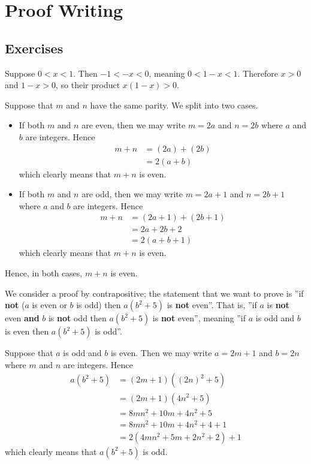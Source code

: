 \section{Proof Writing}
\subsection*{Exercises}
\begin{questions}
    \item Suppose $0 < x < 1$. Then $-1 < -x < 0$, meaning $0 < 1 - x < 1$. Therefore $x > 0$ and $1-x > 0$, so their product $x(1-x) > 0$.

    \item Suppose that $m$ and $n$ have the same parity. We split into two cases.
        \begin{itemize}
            \item If both $m$ and $n$ are even, then we may write $m = 2a$ and $n = 2b$ where $a$ and $b$ are integers. Hence
            \begin{align*}
                m + n &= (2a) + (2b) \\
                &= 2(a+b)
            \end{align*}
            which clearly means that $m + n$ is even.
            \item If both $m$ and $n$ are odd, then we may write $m = 2a + 1$ and $n = 2b + 1$ where $a$ and $b$ are integers. Hence
            \begin{align*}
                m + n &= (2a + 1) + (2b + 1)\\
                &= 2a + 2b + 2\\
                &= 2(a + b + 1)
            \end{align*}
            which clearly means that $m+n$ is even.
        \end{itemize}
    Hence, in both cases, $m + n$ is even.

    \item We consider a proof by contrapositive; the statement that we want to prove is ''if \textbf{not} ($a$ is even or $b$ is odd) then $a(b^2+5)$ is \textbf{not} even''. That is, ''if $a$ is \textbf{not} even \textbf{and} $b$ is \textbf{not} odd then $a(b^2+5)$ is \textbf{not} even'', meaning ''if $a$ is odd and $b$ is even then $a(b^2+5)$ is odd''.

    Suppose that $a$ is odd and $b$ is even. Then we may write $a = 2m + 1$ and $b = 2n$ where $m$ and $n$ are integers. Hence
    \begin{align*}
        a(b^2+5) &= (2m+1)\left((2n)^2 + 5\right)\\
        &= (2m+1)(4n^2 + 5)\\
        &= 8mn^2 + 10m + 4n^2 + 5\\
        &= 8mn^2 + 10m + 4n^2 + 4 + 1\\
        &= 2(4mn^2 + 5m + 2n^2 + 2) + 1
    \end{align*}
    which clearly means that $a(b^2+5)$ is odd.


\end{questions}
